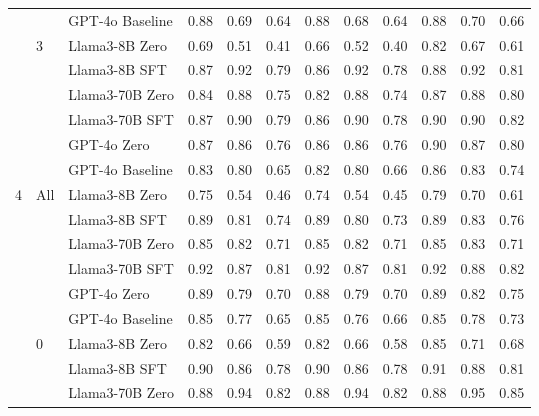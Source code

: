 \begin{longtable}[t]{ll>{}l|rr>{}r|rr>{}r|rrr}
 &  & GPT-4o Baseline & 0.88 & 0.69 & 0.64 & 0.88 & 0.68 & 0.64 & 0.88 & 0.70 & 0.66\\
\cmidrule{2-12}
 & 3 & Llama3-8B Zero & 0.69 & 0.51 & 0.41 & 0.66 & 0.52 & 0.40 & 0.82 & 0.67 & 0.61\\

 &  & Llama3-8B SFT & 0.87 & 0.92 & 0.79 & 0.86 & 0.92 & 0.78 & 0.88 & 0.92 & 0.81\\

 &  & Llama3-70B Zero & 0.84 & 0.88 & 0.75 & 0.82 & 0.88 & 0.74 & 0.87 & 0.88 & 0.80\\

 &  & Llama3-70B SFT & 0.87 & 0.90 & 0.79 & 0.86 & 0.90 & 0.78 & 0.90 & 0.90 & 0.82\\

 &  & GPT-4o Zero & 0.87 & 0.86 & 0.76 & 0.86 & 0.86 & 0.76 & 0.90 & 0.87 & 0.80\\

 &  & GPT-4o Baseline & 0.83 & 0.80 & 0.65 & 0.82 & 0.80 & 0.66 & 0.86 & 0.83 & 0.74\\
\cmidrule{1-12}
4 & All & Llama3-8B Zero & 0.75 & 0.54 & 0.46 & 0.74 & 0.54 & 0.45 & 0.79 & 0.70 & 0.61\\

 &  & Llama3-8B SFT & 0.89 & 0.81 & 0.74 & 0.89 & 0.80 & 0.73 & 0.89 & 0.83 & 0.76\\

 &  & Llama3-70B Zero & 0.85 & 0.82 & 0.71 & 0.85 & 0.82 & 0.71 & 0.85 & 0.83 & 0.71\\

 &  & Llama3-70B SFT & 0.92 & 0.87 & 0.81 & 0.92 & 0.87 & 0.81 & 0.92 & 0.88 & 0.82\\

 &  & GPT-4o Zero & 0.89 & 0.79 & 0.70 & 0.88 & 0.79 & 0.70 & 0.89 & 0.82 & 0.75\\

 &  & GPT-4o Baseline & 0.85 & 0.77 & 0.65 & 0.85 & 0.76 & 0.66 & 0.85 & 0.78 & 0.73\\
\cmidrule{2-12}
 & 0 & Llama3-8B Zero & 0.82 & 0.66 & 0.59 & 0.82 & 0.66 & 0.58 & 0.85 & 0.71 & 0.68\\

 &  & Llama3-8B SFT & 0.90 & 0.86 & 0.78 & 0.90 & 0.86 & 0.78 & 0.91 & 0.88 & 0.81\\

 &  & Llama3-70B Zero & 0.88 & 0.94 & 0.82 & 0.88 & 0.94 & 0.82 & 0.88 & 0.95 & 0.85\\


\end{longtable}
